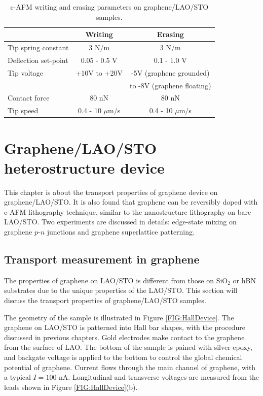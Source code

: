 \documentclass[pdflatex, sectionletters, 12pt]{pittetd}    %
\begin{document}
\begin{table}[h!]
	\centering
	\begin{tabular}{l|cc}
		\hline
				&	Writing	&	Erasing \\ \hline
		Tip spring constant	&	3 N/m	& 3 N/m	\\ 
		Deflection set-point	&	0.05 - 0.5 V	&	0.1 - 1.0 V	\\	
		Tip voltage	&	+10V to +20V	& -5V (graphene grounded) \\
			&	& to -8V (graphene floating) \\
		Contact force	&	80 nN	&	80 nN	\\
		Tip speed	&	0.4 - 10 $\mu$m/s	&	0.4 - 10 $\mu$m/s \\ 
	\end{tabular}
	\caption{c-AFM writing and erasing parameters on graphene/LAO/STO samples.}
	\label{TAB:GCOLithography}
	
\end{table}

\chapter{Graphene/LAO/STO heterostructure device}

This chapter is about the transport properties of graphene device on graphene/LAO/STO. It is also found that graphene can be reversibly doped with c-AFM lithography technique, similar to the nanostructure lithography on bare LAO/STO. Two experiments are discussed in details: edge-state mixing on graphene $p$-$n$ junctions and graphene superlattice patterning.

\section{Transport measurement in graphene}

The properties of graphene on LAO/STO is different from those on SiO$_2$ or hBN substrates due to the unique properties of the LAO/STO. This section will discuss the transport properties of graphene/LAO/STO samples. 

The geometry of the sample is illustrated in Figure \ref{FIG:HallDevice}. The graphene on LAO/STO is patterned into Hall bar shapes, with the procedure discussed in previous chapters. Gold electrodes make contact to the graphene from the surface of LAO. The bottom of the sample is pained with silver epoxy, and backgate voltage is applied to the bottom to control the global chemical potential of graphene. Current flows through the main channel of graphene, with a typical $I = 100$ nA. Longitudinal and transverse voltages are measured from the leads shown in Figure \ref{FIG:HallDevice}(b).
\end{document}

